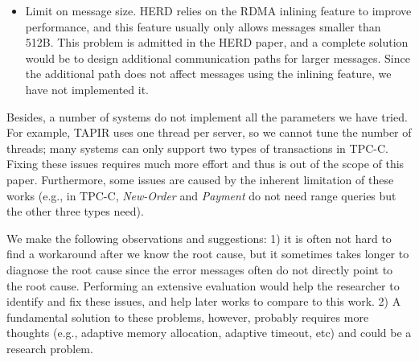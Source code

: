 \begin{itemize}[leftmargin=*]
    \vspace{-.05in}
    \item Limit on message size. HERD relies on the RDMA inlining feature to improve
    performance, and this feature usually only allows messages smaller than 512B.
    This problem is admitted in the HERD paper, and a complete solution would be to design
    additional communication paths for larger messages. Since the additional path does not affect
    messages using the inlining feature, we have not implemented it.
    
\end{itemize}

Besides, a number of systems do not implement all the parameters we have tried.
For example,
TAPIR
uses one thread per server, so we cannot tune the number of threads; many systems can only
support two types of transactions in TPC-C. Fixing these issues requires much more effort
and thus is out of the scope of this paper. Furthermore, some issues are caused by the inherent limitation of these
works (e.g., in TPC-C, \emph{New-Order} and \emph{Payment} do not need range queries
but the other three types need).

We make the following observations and suggestions: 1) it is often not hard to find
a workaround after we know the root cause,
but it sometimes takes longer to diagnose the root cause since the error messages often do not directly point to the root cause.
Performing an extensive evaluation would help the researcher to identify and fix these issues,
and help later works to compare to this work. 2) A fundamental solution to these problems, however,
probably requires more thoughts (e.g., adaptive memory allocation, adaptive timeout, etc) and 
could be a research problem.

